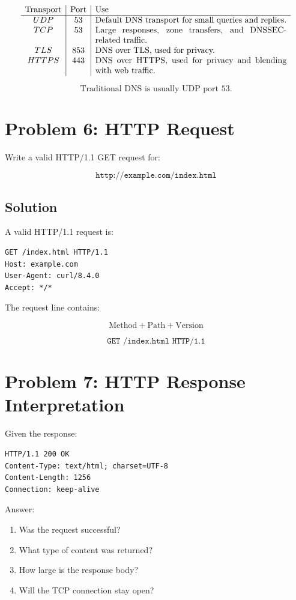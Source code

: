\documentclass[12pt]{article}
\begin{document}
\[
\begin{array}{c|c|p{8cm}}
\text{Transport} & \text{Port} & \text{Use} \\
\hline
UDP & 53 & Default DNS transport for small queries and replies. \\
TCP & 53 & Large responses, zone transfers, and DNSSEC-related traffic. \\
TLS & 853 & DNS over TLS, used for privacy. \\
HTTPS & 443 & DNS over HTTPS, used for privacy and blending with web traffic.
\end{array}
\]

\[
\boxed{\text{Traditional DNS is usually UDP port 53.}}
\]

\section*{Problem 6: HTTP Request}

Write a valid HTTP/1.1 GET request for:

\[
\texttt{http://example.com/index.html}
\]

\subsection*{Solution}

A valid HTTP/1.1 request is:

\begin{lstlisting}
GET /index.html HTTP/1.1
Host: example.com
User-Agent: curl/8.4.0
Accept: */*
\end{lstlisting}

The request line contains:

\[
\text{Method} + \text{Path} + \text{Version}
\]

\[
\boxed{\texttt{GET /index.html HTTP/1.1}}
\]

\section*{Problem 7: HTTP Response Interpretation}

Given the response:

\begin{lstlisting}
HTTP/1.1 200 OK
Content-Type: text/html; charset=UTF-8
Content-Length: 1256
Connection: keep-alive
\end{lstlisting}

Answer:

\begin{enumerate}
    \item Was the request successful?
    \item What type of content was returned?
    \item How large is the response body?
    \item Will the TCP connection stay open?
\end{enumerate}
\end{document}
